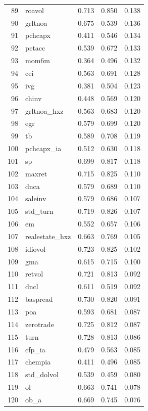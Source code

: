 \documentclass[12pt]{article}
\begin{document}
\begin{footnotesize}
\begin{longtable}{rl|c|c|c}
		89 & roavol & 0.713 & 0.850 & 0.138 \\ 
		90 & grltnoa & 0.675 & 0.539 & 0.136 \\ 
		91 & pchcapx & 0.411 & 0.546 & 0.134 \\ 
		92 & pctacc & 0.539 & 0.672 & 0.133 \\ 
		93 & mom6m & 0.364 & 0.496 & 0.132 \\ 
		94 & cei & 0.563 & 0.691 & 0.128 \\ 
		95 & ivg & 0.381 & 0.504 & 0.123 \\ 
		96 & chinv & 0.448 & 0.569 & 0.120 \\ 
		97 & grltnoa\_hxz & 0.563 & 0.683 & 0.120 \\ 
		98 & egr & 0.579 & 0.699 & 0.120 \\ 
		99 & tb & 0.589 & 0.708 & 0.119 \\ 
		100 & pchcapx\_ia & 0.512 & 0.630 & 0.118 \\ 
		101 & sp & 0.699 & 0.817 & 0.118 \\ 
		102 & maxret & 0.715 & 0.825 & 0.110 \\ 
		103 & dnca & 0.579 & 0.689 & 0.110 \\ 
		104 & saleinv & 0.579 & 0.686 & 0.107 \\ 
		105 & std\_turn & 0.719 & 0.826 & 0.107 \\ 
		106 & em & 0.552 & 0.657 & 0.106 \\ 
		107 & realestate\_hxz & 0.663 & 0.769 & 0.105 \\ 
		108 & idiovol & 0.723 & 0.825 & 0.102 \\ 
		109 & gma & 0.615 & 0.715 & 0.100 \\ 
		110 & retvol & 0.721 & 0.813 & 0.092 \\ 
		111 & dncl & 0.611 & 0.519 & 0.092 \\ 
		112 & baspread & 0.730 & 0.820 & 0.091 \\ 
		113 & poa & 0.593 & 0.681 & 0.087 \\ 
		114 & zerotrade & 0.725 & 0.812 & 0.087 \\ 
		115 & turn & 0.728 & 0.813 & 0.086 \\ 
		116 & cfp\_ia & 0.479 & 0.563 & 0.085 \\ 
		117 & chempia & 0.411 & 0.496 & 0.085 \\ 
		118 & std\_dolvol & 0.539 & 0.459 & 0.080 \\ 
		119 & ol & 0.663 & 0.741 & 0.078 \\ 
		120 & ob\_a & 0.669 & 0.745 & 0.076 \\ 

\end{longtable}
\end{footnotesize}
\end{document}
